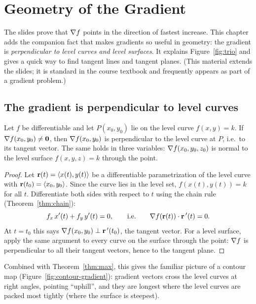 \section{Geometry of the Gradient}\label{ch:geometry}

The slides prove that $\nabla f$ points in the direction of fastest increase.
This chapter adds the companion fact that makes gradients so useful in
geometry: the gradient is \emph{perpendicular to level curves and level
surfaces}. It explains Figure~\ref{fig:trio} and gives a quick way to find
tangent lines and tangent planes. (This material extends the slides; it is
standard in the course textbook and frequently appears as part of a gradient
problem.)

\subsection{The gradient is perpendicular to level curves}

\begin{theorem}\label{thm:grad-perp}
Let $f$ be differentiable and let $P(x_0,y_0)$ lie on the level curve
$f(x,y)=k$. If $\nabla f(x_0,y_0)\neq\mathbf{0}$, then $\nabla f(x_0,y_0)$ is
perpendicular to the level curve at $P$, i.e.\ to its tangent vector.
The same holds in three variables: $\nabla f(x_0,y_0,z_0)$ is normal to the
level surface $f(x,y,z)=k$ through the point.
\end{theorem}

\begin{proof}
Let $\mathbf{r}(t)=\left\langle x(t),y(t) \right\rangle$ be a differentiable parametrization of the level
curve with $\mathbf{r}(t_0)=\left\langle x_0,y_0 \right\rangle$. Since the curve lies in the level set,
$f(x(t),y(t))=k$ for all $t$. Differentiate both sides with respect to $t$
using the chain rule (Theorem~\ref{thm:chain}):
\[
  f_x\,x'(t)+f_y\,y'(t)=0,\qquad\text{i.e.}\qquad \nabla f(\mathbf{r}(t))\cdot\mathbf{r}\,'(t)=0 .
\]
At $t=t_0$ this says $\nabla f(x_0,y_0)\perp\mathbf{r}\,'(t_0)$, the tangent vector.
For a level surface, apply the same argument to every curve on the surface
through the point: $\nabla f$ is perpendicular to all their tangent vectors,
hence to the tangent plane.
\end{proof}

Combined with Theorem~\ref{thm:max}, this gives the familiar picture of a
contour map (Figure~\ref{fig:contour-gradient}): gradient vectors cross the
level curves at right angles, pointing ``uphill'', and they are longest where
the level curves are packed most tightly (where the surface is steepest).


